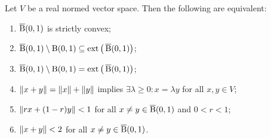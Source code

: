 \begin{lemma} \label{strictConvexityUnitBall}
Let $V$ be a real normed vector space. Then the following are equivalent:
\begin{enumerate}
\item $\operatorname{\overline{B}}(0,1)$ is strictly convex;
\item $\operatorname{\overline{B}}(0,1)\setminus\operatorname{B}(0,1) \subseteq \operatorname{ext}\big(\operatorname{\overline{B}}(0,1)\big)$;
\item $\operatorname{\overline{B}}(0,1)\setminus\operatorname{B}(0,1) = \operatorname{ext}\big(\operatorname{\overline{B}}(0,1)\big)$;
\item $\lVert x+y\rVert = \lVert x\rVert+\lVert y\rVert$ implies $\exists \lambda \geq 0: x = \lambda y$ for all $x,y \in V$;
\item $\lVert rx+(1-r)y\rVert< 1$ for all $x\neq y\in \operatorname{\overline{B}}(0,1)$ and $0< r < 1$;
\item $\lVert x+y\rVert< 2$ for all $x\neq y\in \operatorname{\overline{B}}(0,1)$.
\end{enumerate}
\end{lemma}
